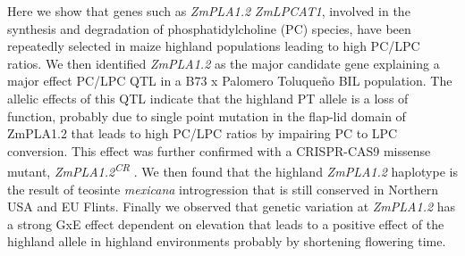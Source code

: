 \documentclass[9pt,twocolumn,twoside,lineno]{BioRxiv}
\begin{document}
Here we show that genes such as \textit{ZmPLA1.2} \textit{ZmLPCAT1}, involved in the synthesis and degradation of phosphatidylcholine (PC) species, have been repeatedly selected in maize highland populations leading to high PC/LPC ratios.   
We then identified \textit{ZmPLA1.2} as the major candidate gene explaining a major effect PC/LPC QTL in a B73 x Palomero Toluqueño BIL population. 
The allelic effects of this QTL indicate that the highland PT allele is a loss of function, probably due to single point mutation in the flap-lid domain of ZmPLA1.2 that leads to high PC/LPC ratios by impairing PC to LPC conversion. 
This effect was further confirmed with a CRISPR-CAS9 missense mutant, \textit{ZmPLA1.2\textsuperscript{CR}} .
We then found that the highland \textit{ZmPLA1.2} haplotype is the result of teosinte \textit{mexicana} introgression that is still conserved in Northern USA and EU Flints. 
Finally we observed that genetic variation at \textit{ZmPLA1.2} has a strong GxE effect dependent on elevation that leads to a positive effect of the highland allele in highland environments probably by shortening flowering time.
\end{document}
